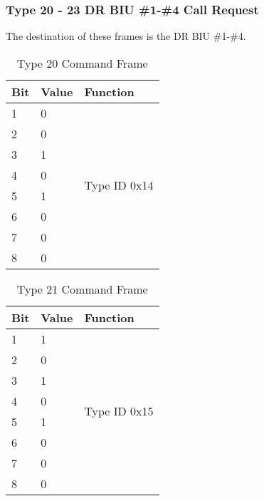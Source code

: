 \documentclass[]{article}
\begin{document}
\clearpage

\subsubsection {Type 20 - 23 DR BIU \#1-\#4 Call Request}

The destination of these frames is the DR BIU \#1-\#4.

\begin{table}[ht]
	\centering
	\begin{tabular}{lll}
		\hline
		\textbf{Bit} & \textbf{Value} & \textbf{Function}             \\ \hline
		1            & 0              & \multirow{8}{*}{Type ID 0x14} \\
		2            & 0              &                               \\
		3            & 1              &                               \\
		4            & 0              &                               \\
		5            & 1              &                               \\
		6            & 0              &                               \\
		7            & 0              &                               \\
		8            & 0              &                               \\ \hline
	\end{tabular}
	\caption{Type 20 Command Frame}
	\label{tab:type-20-frame}
\end{table}

\begin{table}[ht]
	\centering
	\begin{tabular}{lll}
		\hline
		\textbf{Bit} & \textbf{Value} & \textbf{Function}             \\ \hline
		1            & 1              & \multirow{8}{*}{Type ID 0x15} \\
		2            & 0              &                               \\
		3            & 1              &                               \\
		4            & 0              &                               \\
		5            & 1              &                               \\
		6            & 0              &                               \\
		7            & 0              &                               \\
		8            & 0              &                               \\ \hline
	\end{tabular}
	\caption{Type 21 Command Frame}
	\label{tab:type-21-frame}
\end{table}
\end{document}
